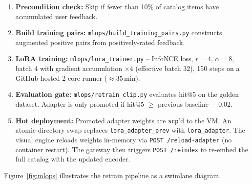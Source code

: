 \documentclass[12pt]{article}
\begin{document}
\begin{enumerate}[leftmargin=*]
  \item \textbf{Precondition check:} Skip if fewer than 10\% of catalog items have accumulated user feedback.
  \item \textbf{Build training pairs:} \texttt{mlops/build\_training\_pairs.py} constructs augmented positive pairs from positively-rated feedback.
  \item \textbf{LoRA training:} \texttt{mlops/lora\_trainer.py} -- InfoNCE loss, $r=4$, $\alpha=8$, batch 4 with gradient accumulation $\times$4 (effective batch 32), 150 steps on a GitHub-hosted 2-core runner ($\approx$35\,min).
  \item \textbf{Evaluation gate:} \texttt{mlops/retrain\_clip.py} evaluates hit@5 on the golden dataset. Adapter is only promoted if hit@5 $\ge$ previous baseline $-$ 0.02.
  \item \textbf{Hot deployment:} Promoted adapter weights are \texttt{scp}'d to the VM. An atomic directory swap replaces \texttt{lora\_adapter\_prev} with \texttt{lora\_adapter}. The visual engine reloads weights in-memory via \texttt{POST /reload-adapter} (no container restart). The gateway then triggers \texttt{POST /reindex} to re-embed the full catalog with the updated encoder.
\end{enumerate}

Figure~\ref{fig:mlops} illustrates the retrain pipeline as a swimlane diagram.
\end{document}
